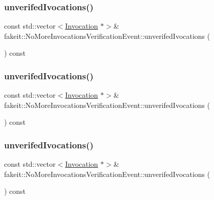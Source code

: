 \subsubsection{\texorpdfstring{unverifedIvocations()}{unverifedIvocations()}\hspace{0.1cm}{\footnotesize\ttfamily [1/9]}}
{\footnotesize\ttfamily const std\+::vector$<$\mbox{\hyperlink{structfakeit_1_1Invocation}{Invocation}} $\ast$$>$\& fakeit\+::\+No\+More\+Invocations\+Verification\+Event\+::unverifed\+Ivocations (\begin{DoxyParamCaption}{ }\end{DoxyParamCaption}) const\hspace{0.3cm}{\ttfamily [inline]}}

\mbox{\label{structfakeit_1_1NoMoreInvocationsVerificationEvent_aaff3cb0916a4fe853f6f4e5fcc7f2632}} 
\subsubsection{\texorpdfstring{unverifedIvocations()}{unverifedIvocations()}\hspace{0.1cm}{\footnotesize\ttfamily [2/9]}}
{\footnotesize\ttfamily const std\+::vector$<$\mbox{\hyperlink{structfakeit_1_1Invocation}{Invocation}} $\ast$$>$\& fakeit\+::\+No\+More\+Invocations\+Verification\+Event\+::unverifed\+Ivocations (\begin{DoxyParamCaption}{ }\end{DoxyParamCaption}) const\hspace{0.3cm}{\ttfamily [inline]}}

\mbox{\label{structfakeit_1_1NoMoreInvocationsVerificationEvent_aaff3cb0916a4fe853f6f4e5fcc7f2632}} 
\subsubsection{\texorpdfstring{unverifedIvocations()}{unverifedIvocations()}\hspace{0.1cm}{\footnotesize\ttfamily [3/9]}}
{\footnotesize\ttfamily const std\+::vector$<$\mbox{\hyperlink{structfakeit_1_1Invocation}{Invocation}} $\ast$$>$\& fakeit\+::\+No\+More\+Invocations\+Verification\+Event\+::unverifed\+Ivocations (\begin{DoxyParamCaption}{ }\end{DoxyParamCaption}) const\hspace{0.3cm}{\ttfamily [inline]}}

